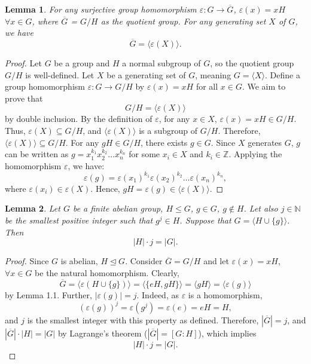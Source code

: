 \documentclass{article}
\newtheorem{lemma}{Lemma}
\begin{document}
\begin{lemma}
For any surjective group homomorphism \( \varepsilon \colon G \to \overline{G} \), \( \varepsilon(x) = xH \)  \( \forall x \in G \), where \( \overline{G} \) = \( G/H \) as the quotient group. For any generating set \( X \) of \( G \), we have
\[
\overline{G} = \langle \varepsilon(X) \rangle.
\]
\end{lemma}
\begin{proof}
    Let \( G \) be a group and \( H \) a normal subgroup of \( G \), so the quotient group \( G / H \) is well-defined. Let \( X \) be a generating set of \( G \), meaning \( G = \langle X \rangle \). Define a group homomorphism \( \varepsilon: G \to G / H \) by \( \varepsilon(x) = xH \) for all \( x \in G \). We aim to prove that
    \[
    G / H = \langle \varepsilon(X) \rangle
    \]
    by double inclusion.
    By the definition of \( \varepsilon \), for any \( x \in X \), \( \varepsilon(x) = xH \in G / H \).  
    Thus, \( \varepsilon(X) \subseteq G / H \), and \( \langle \varepsilon(X) \rangle \) is a subgroup of \( G / H \).  
    Therefore, \( \langle \varepsilon(X) \rangle \subseteq G / H \).
    For any \( gH \in G / H \), there exists \( g \in G \).  
    Since \( X \) generates \( G \), \( g \) can be written as \( g = x_1^{k_1} x_2^{k_2} \dots x_n^{k_n} \) for some \( x_i \in X \) and \( k_i \in \mathbb{Z} \).  
    Applying the homomorphism \( \varepsilon \), we have:
    \[
    \varepsilon(g) = \varepsilon(x_1)^{k_1} \varepsilon(x_2)^{k_2} \dots \varepsilon(x_n)^{k_n},
    \]
    where \( \varepsilon(x_i) \in \varepsilon(X) \).  
    Hence, \( gH = \varepsilon(g) \in \langle \varepsilon(X) \rangle \). 
\end{proof}



\begin{lemma}
Let \( G \) be a finite abelian group, \( H \leq G \), \( g \in G \), \( g \notin H \). Let also \( j \in \mathbb{N} \) be the smallest positive integer such that \( g^j \in H \). Suppose that \( G = \langle H \cup \{g\} \rangle \). Then
\[
|H| \cdot j = |G|.
\]
\end{lemma}
\begin{proof}
Since \( G \) is abelian, \( H \trianglelefteq G \). Consider \( \overline{G} = G / H \) and let \( \varepsilon(x) = xH \), \( \forall x \in G \) be the natural homomorphism. Clearly, 
\[
\overline{G} = \langle \varepsilon(H \cup \{g\}) \rangle = \langle \{eH, gH\} \rangle = \langle gH \rangle = \langle \varepsilon(g) \rangle
\]
by Lemma 1.1. Further, \( |\varepsilon(g)| = j \). Indeed, as \( \varepsilon \) is a homomorphism, 
\[
(\varepsilon(g))^j = \varepsilon(g^j) = \varepsilon(e) = eH = H,
\]
and \( j \) is the smallest integer with this property as defined. Therefore, \( |\overline{G}| = j \), and \( |\overline{G}| \cdot |H| = |G| \) by Lagrange's theorem (\( |\overline{G}| = [G : H] \)), which implies
\[
|H| \cdot j = |G|.
\]
\end{proof}
\end{document}
